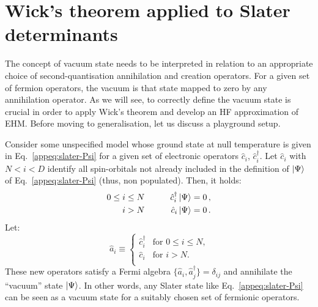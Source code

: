 \section{Wick's theorem applied to Slater determinants}\label{appsec:slater-wick}

The concept of vacuum state needs to be interpreted in relation to an appropriate choice of second-quantisation annihilation and creation operators. For a given set of fermion operators, the vacuum is that state mapped to zero by any annihilation operator. As we will see, to correctly define the vacuum state is crucial in order to apply Wick's theorem and develop an HF approximation of EHM. Before moving to generalisation, let us discuss a playground setup.

Consider some unspecified model whose ground state at null temperature is given in Eq.~\eqref{appeq:slater-Psi} for a given set of electronic operators $\hat c_i$, $\hat c_i^\dagger$. Let $\hat c_i$ with $N <i < D$ identify all spin-orbitals not already included in the definition of $\ket{\Psi}$ of Eq.~\eqref{appeq:slater-Psi} (thus, non populated). Then, it holds:
\[
	\begin{aligned}
		0\le i &\le N \qquad &\hat c_i^\dagger \ket{\Psi} = 0 \, , \\
		i &> N \qquad &\hat c_i \ket{\Psi} = 0 \, .
	\end{aligned}
\]
Let:
\begin{equation}\label{appeq:ai-def}
	\hat a_i \equiv \begin{cases}
		\hat c_i^\dagger &\text{for $0\le i \le N$,}\\
		\hat c_i &\text{for $i > N$.} \\
	\end{cases}
\end{equation}
These new operators satisfy a Fermi algebra $\lbrace \hat a_i , \hat a_j^\dagger \rbrace = \delta_{ij}$ and annihilate the ``vacuum'' state $\ket{\Psi}$. In other words, any Slater state like Eq.~\eqref{appeq:slater-Psi} can be seen as a vacuum state for a suitably chosen set of fermionic operators.

